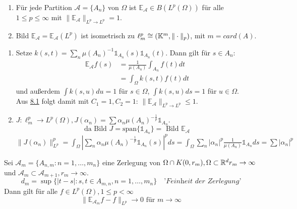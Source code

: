 \begin{kor}
	\begin{enumerate}[label=\alph*\upshape)]
		\item Für jede Partition $\mathcal{A} = \{ A_{n} \}$ von $\Omega$ ist $\mathds{E}_{\mathcal{A}} \in B \left( L^{p}(\Omega) \right)$ für alle $1 \leq p \leq \infty$ mit $\| \mathds{E}_{\mathcal{A}} \|_{L^{p} \rightarrow L^{p}} = 1.$
		\item Bild $\mathds{E}_{\mathcal{A}} = \mathds{E}_{\mathcal{A}}(L^{p})$ ist isometrisch zu $\ell^{p}_{m} \cong \left( \mathbb{K}^{m}, \| \cdot \|_{p} \right)$, mit $m = card(A)$.  
	\end{enumerate}
	\begin{beweis}	
		\begin{enumerate}[label=\alph*\upshape)]	
			\item Setze $k(s, t) = \sum_{n} \mu(A_{n})^{-1} \mathds{1}_{A_{n}}(s) \mathds{1}_{A_{n}}(t)$. Dann gilt für $s \in A_{n}$:
				\begin{align*}
					 \mathds{E}_{\mathcal{A}} f(s) & = \frac{1}{\mu(A_{n})} \int_{A_{n}} f(t) dt \\
					 & = \int_{\Omega} k(s, t) f(t) dt
				\end{align*}
				und au{\ss}erdem $\int k(s, u) du = 1$ für $s \in \Omega$, $\int k(s, u) ds = 1$ für $u \in \Omega$. \\
				Aus \hyperref[satz:8.1]{8.1} folgt damit mit $C_{1} = 1, C_{2} = 1$: $\| \mathds{E}_{\mathcal{A}} \|_{L^{p} \rightarrow L^{p}} \leq 1$.
			\item $J: \ell_{m}^{p} \rightarrow L^{p}(\Omega), J(\alpha_{n}) = \sum \alpha_{n} \mu(A_{n})^{- \frac{1}{p}} \mathds{1}_{A_{n}}.$ \\
				\[ \text{da Bild } J = \text{span} \{ \mathds{1}_{A_{n}} \} = \text{ Bild } \mathds{E}_{\mathcal{A}} \]
				$\| J ( \alpha_{n}) \|_{L^{p}}^{p} = \int_{\Omega} | \sum_{n} \alpha_{n} \mu(A_{n})^{- \frac{1}{p}} \mathds{1}_{A_{n}}(s) |^{p} ds = \int_{\Omega} \sum_{n} | \alpha_{n} |^{p} \frac{1}{\mu(A_{n})} \mathds{1}_{A_{n}} ds = \sum |\alpha_{n}|^{p}$
		\end{enumerate}
	\end{beweis}
\end{kor}


\begin{satz} 
	Sei $\mathcal{A}_{m} = \{ A_{n, m} : n = 1, \dotsc, m_{n} \}$ eine Zerlegung von $ \Omega \cap K(0, r_{m}), \Omega \subset \mathbb{R}^{d} r_{m} \rightarrow \infty$ und $\mathcal{A}_{m} \subset \mathcal{A}_{m + 1}, r_{m} \rightarrow \infty$.
	\[ d_{m} = \sup \{ |t - s|: s, t \in A_{m, n}, n = 1, \dotsc, m_{n} \} \quad \textit{'Feinheit der Zerlegung'} \]
	Dann gilt für alle $f \in L^{p}(\Omega), 1 \leq p < \infty$
	\[ \| \mathds{E}_{\mathcal{A}_{m}} f - f \|_{L^{p}} \rightarrow 0 \text{ für } m \rightarrow \infty \]
\end{satz}

